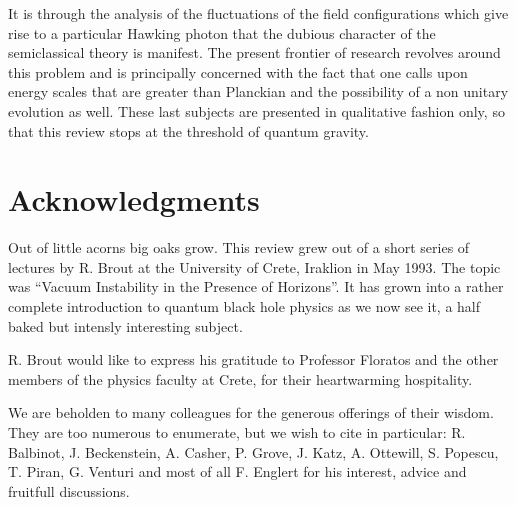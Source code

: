 \documentclass[12pt,oneside]{report}
\makeatletter
\newcommand{\INTRO}[1]
{
\renewcommand{\thechapter}{\fnsymbol{chapter}}
\setcounter{chapter}{-1}
\renewcommand{\@chapapp}{}
\chapter{#1}
\renewcommand{\thechapter}{\arabic{chapter}}
\renewcommand{\@chapapp}{Chapter}
}
\makeatother
\begin{document}
It is through the analysis of the fluctuations of the field
configurations which give rise to a particular Hawking photon that the
dubious character of the semiclassical theory is manifest. The present
frontier of research revolves around this problem and is principally
concerned with the fact that one calls upon energy scales that are greater
than Planckian and the possibility of a non unitary evolution as well. These
last subjects are presented in qualitative fashion only, so that this review
stops at the threshold of quantum gravity. \newpage

\tableofcontents

\INTRO{Acknowledgments}


Out of little acorns big oaks grow. This review grew out
of a short series of lectures by R. Brout at the
University of Crete, Iraklion in May 1993. The topic was
``Vacuum Instability in the Presence of Horizons''. It has
grown into a rather complete introduction to quantum black
hole physics as we now see it, a half baked but intensly
interesting subject.

R. Brout would like to express his gratitude to Professor
Floratos and the other members of the physics faculty at
Crete, for their heartwarming hospitality.

We are beholden to many colleagues for the generous
offerings of their wisdom. They are too numerous to
enumerate, but we wish to cite in particular: R. Balbinot,
J. Beckenstein, A. Casher, P. Grove, J. Katz, A. Ottewill,
S. Popescu, T. Piran, G. Venturi and most of all F.
Englert for his interest, advice and fruitfull discussions.


\strut \vfill \pagebreak

\end{document}
